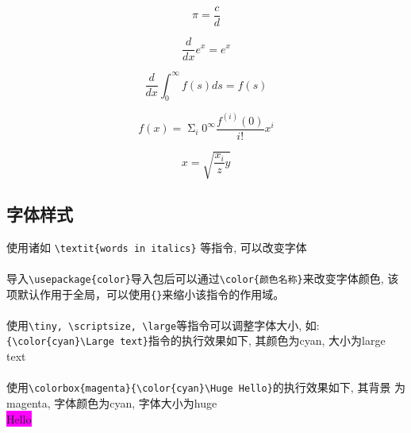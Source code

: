 \documentclass{article}
\begin{document}
            \begin{equation}
            \pi = \frac c d
            \end{equation}

            \begin{equation}
            \frac{d}{dx}e^x=e^x
            \end{equation}

            \begin{equation}
            \frac{d}{dx} \int _0 ^\infty {f(s)ds} = f(s)
            \end{equation}

            \begin{equation}
            f(x) = \mathop{\Sigma} _i 0^{\infty} \frac{f^{(i)}(0)}{i!}x^i
            \end{equation}

            \begin{equation}
            x = \sqrt{\frac{x_i}{z}y}
            \end{equation}

        \subsection {字体样式}
            使用诸如 \verb|\textit{words in italics}| 等指令, 可以改变字体\\
            \hspace*{\fill} \\
            导入\verb|\usepackage{color}|导入包后可以通过\verb|\color{颜色名称}|来改变字体颜色, 
            该项默认作用于全局，可以使用\verb|{}|来缩小该指令的作用域。\\
            \hspace*{\fill} \\
            使用\verb|\tiny, \scriptsize, \large|等指令可以调整字体大小, 如: \\
            \verb|{\color{cyan}\Large text}|指令的执行效果如下, 其颜色为cyan, 大小为large\\
            {\color{cyan}\Large text}\\
            \hspace*{\fill} \\
            使用\verb|\colorbox{magenta}{\color{cyan}\Huge Hello}|的执行效果如下, 其背景
            为magenta, 字体颜色为cyan, 字体大小为huge\\
            \colorbox{magenta}{\color{cyan}\Huge Hello}
\end{document}
